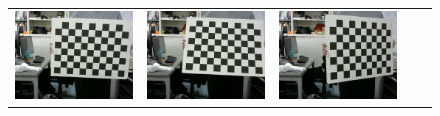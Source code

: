 \documentclass[]{jarticle}          %
\begin{document}
\begin{figure}[!ht]
\begin{center}
\begin{tabular}{ccccc}
      \includegraphics[keepaspectratio, scale=0.1]{figures/carib/camera2/7.png}&
      \includegraphics[keepaspectratio, scale=0.1]{figures/carib/camera2/8.png}&
      \includegraphics[keepaspectratio, scale=0.1]{figures/carib/camera2/9.png}&

\end{tabular}
\end{center}
\end{figure}
\end{document}
